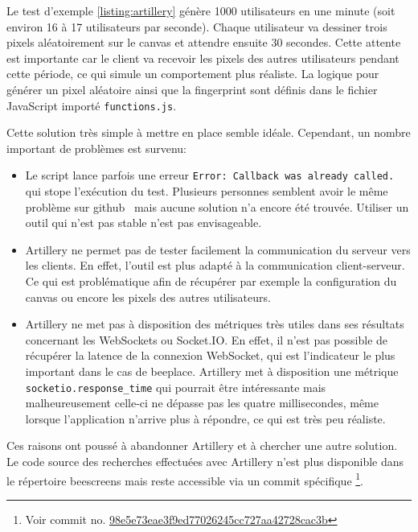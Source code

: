 Le test d'exemple \ref{listing:artillery} génère 1000 utilisateurs en une minute (soit environ 16 à 17 utilisateurs par seconde). Chaque utilisateur va dessiner trois pixels aléatoirement sur le canvas et attendre ensuite 30 secondes. Cette attente est importante car le client va recevoir les pixels des autres utilisateurs pendant cette période, ce qui simule un comportement plus réaliste. La logique pour générer un pixel aléatoire ainsi que la fingerprint sont définis dans le fichier JavaScript importé \texttt{functions.js}.

Cette solution très simple à mettre en place semble idéale. Cependant, un nombre important de problèmes est survenu:

\begin{itemize}
  \item Le script lance parfois une erreur \texttt{Error: Callback was already called.} qui stope l'exécution du test. Plusieurs personnes semblent avoir le même problème sur \gls{github}~\cite{artillery-callback-issue} mais aucune solution n'a encore été trouvée. Utiliser un outil qui n'est pas stable n'est pas envisageable.
  \item Artillery ne permet pas de tester facilement la communication du serveur vers les clients. En effet, l'outil est plus adapté à la communication client-serveur. Ce qui est problématique afin de récupérer par exemple la configuration du canvas ou encore les pixels des autres utilisateurs.
  \item Artillery ne met pas à disposition des métriques très utiles dans ses résultats concernant les WebSockets ou Socket.IO. En effet, il n'est pas possible de récupérer la latence de la connexion WebSocket, qui est l'indicateur le plus important dans le cas de \gls{beeplace}. Artillery met à disposition une métrique \texttt{socketio.response\_time} qui pourrait être intéressante mais malheureusement celle-ci ne dépasse pas les quatre millisecondes, même lorsque l'application n'arrive plus à répondre, ce qui est très peu réaliste.
\end{itemize}

Ces raisons ont poussé à abandonner Artillery et à chercher une autre solution. Le code source des recherches effectuées avec Artillery n'est plus disponible dans le répertoire \gls{beescreens} mais reste accessible via un commit spécifique \footnote{Voir commit no. \href{https://gitlab.com/beescreens/beescreens/-/merge_requests/255/diffs?commit_id=98e5e73eae3f9ed77026245cc727aa42728cac3b}{98e5e73eae3f9ed77026245cc727aa42728cac3b}}.

